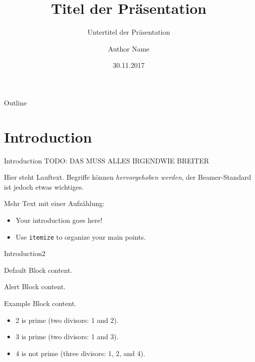 \documentclass[10pt]{beamer}
\title[HAW Hamburg Beamer]{Titel der Präsentation}
\subtitle{Untertitel der Präsentation}
\author{Author Name}
\institute{Hochschule für Angewandte Wissenschaften Hamburg}
\date{30.11.2017}
\begin{document}
\maketitle

\begin{frame}{Outline}
  \tableofcontents
\end{frame}

\section{Introduction}
\begin{frame}[allowframebreaks]{Introduction}
  TODO: DAS MUSS ALLES IRGENDWIE BREITER

  Hier steht Lauftext. Begriffe können \emph{hervorgehoben werden}, der Beamer-Standard ist jedoch \alert{etwas wichtiges}.

  Mehr Text mit einer Aufzählung:
  \begin{itemize}
    \item Your introduction goes here!
    \item Use \texttt{itemize} to organize your main points.
  \end{itemize}
\end{frame}

\begin{frame}{Introduction2}
  \begin{block}{Default}
    Block content.
  \end{block}
  \begin{alertblock}{Alert}
    Block content.
  \end{alertblock}
  \begin{exampleblock}{Example}
    Block content.
  \end{exampleblock}
  \begin{example}
    \begin{itemize}
      \item 2 is prime (two divisors: 1 and 2).
      \item 3 is prime (two divisors: 1 and 3).
      \item 4 is not prime (\alert{three} divisors: 1, 2, and 4).
    \end{itemize}
  \end{example}
\end{frame}
\end{document}
